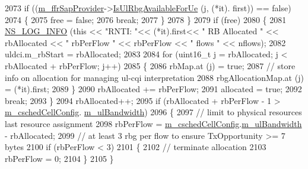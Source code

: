 \begin{DoxyCode}
2073               \textcolor{keywordflow}{if} ((\hyperlink{classns3_1_1CqaFfMacScheduler_a47eeb31f5d284b045d6deba40ac3e108}{m\_ffrSapProvider}->\hyperlink{classns3_1_1LteFfrSapProvider_a3ef80840549b8ea3d50d2cef8a9866e2}{IsUlRbgAvailableForUe} (j, (*it).
      first)) == \textcolor{keyword}{false})
2074                 \{
2075                   free = \textcolor{keyword}{false};
2076                   \textcolor{keywordflow}{break};
2077                 \}
2078             \}
2079           \textcolor{keywordflow}{if} (free)
2080             \{
2081                   \hyperlink{group__logging_gafbd73ee2cf9f26b319f49086d8e860fb}{NS\_LOG\_INFO} (\textcolor{keyword}{this} << \textcolor{stringliteral}{"RNTI: "}<< (*it).first<< \textcolor{stringliteral}{" RB Allocated "} << rbAllocated 
      << \textcolor{stringliteral}{" rbPerFlow "} << rbPerFlow << \textcolor{stringliteral}{" flows "} << nflows);
2082               uldci.m\_rbStart = rbAllocated;
2083 
2084               \textcolor{keywordflow}{for} (uint16\_t j = rbAllocated; j < rbAllocated + rbPerFlow; j++)
2085                 \{
2086                   rbMap.at (j) = \textcolor{keyword}{true};
2087                   \textcolor{comment}{// store info on allocation for managing ul-cqi interpretation}
2088                   rbgAllocationMap.at (j) = (*it).first;
2089                 \}
2090               rbAllocated += rbPerFlow;
2091               allocated = \textcolor{keyword}{true};
2092               \textcolor{keywordflow}{break};
2093             \}
2094           rbAllocated++;
2095           \textcolor{keywordflow}{if} (rbAllocated + rbPerFlow - 1 > \hyperlink{classns3_1_1CqaFfMacScheduler_ad5dc768ca3a3c71671fd64de7de8ec00}{m\_cschedCellConfig}.
      \hyperlink{structns3_1_1FfMacCschedSapProvider_1_1CschedCellConfigReqParameters_a5ab5b102878e6e7e7727a14af4a64d2f}{m\_ulBandwidth})
2096             \{
2097               \textcolor{comment}{// limit to physical resources last resource assignment}
2098               rbPerFlow = \hyperlink{classns3_1_1CqaFfMacScheduler_ad5dc768ca3a3c71671fd64de7de8ec00}{m\_cschedCellConfig}.\hyperlink{structns3_1_1FfMacCschedSapProvider_1_1CschedCellConfigReqParameters_a5ab5b102878e6e7e7727a14af4a64d2f}{m\_ulBandwidth} - rbAllocated;
2099               \textcolor{comment}{// at least 3 rbg per flow to ensure TxOpportunity >= 7 bytes}
2100               \textcolor{keywordflow}{if} (rbPerFlow < 3)
2101                 \{
2102                   \textcolor{comment}{// terminate allocation}
2103                   rbPerFlow = 0;
2104                 \}
2105             \}

\end{DoxyCode}
